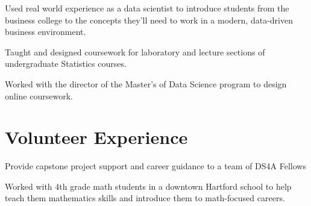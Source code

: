 \documentclass[letterpaper]{deedy-resume} %
\begin{document}
\begin{minipage}[t]{0.9\textwidth}

  \hfill{}
  \hfill
  \begin{tightitemize}
  \item Used real world experience as a data scientist to introduce
    students from the business college to the concepts they'll need to
    work in a modern, data-driven  business environment.
  \end{tightitemize}
  \sectionspace %


  \hfill{}
  \hfill{}
  \begin{tightitemize}
  \item Taught and designed coursework for laboratory and
    lecture sections of undergraduate Statistics courses.
  \item Worked with the director of the Master's of Data Science program
    to design online coursework.
  \end{tightitemize}

  \sectionspace
  \sectionspace
  
  \section{Volunteer Experience}
  \hfill{}
  \hfill
  \begin{tightitemize}
  \item  Provide capstone project support and career guidance to a team of DS4A Fellows
  \end{tightitemize}

  \sectionspace
  
  \hfill{}
  \hfill
  \begin{tightitemize}
  \item  Worked with 4th grade math students in a downtown Hartford
    school to help teach them mathematics skills and introduce them to
    math-focused careers. 
  \end{tightitemize}

\end{minipage}
\end{document}
